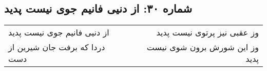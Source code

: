 \begin{center}
\section*{شماره ۳۰: از دنیی فانیم جوی نیست پدید}
\label{sec:030}
\begin{longtable}{l p{0.5cm} r}
از دنیی فانیم جوی نیست پدید
&&
وز عقبی نیز پرتوی نیست پدید
\\
دردا که برفت جان شیرین از دست
&&
وز این شورش برون شوی نیست پدید
\\
\end{longtable}
\end{center}
